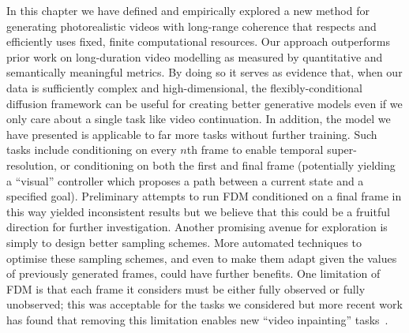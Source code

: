 In this chapter we have defined and empirically explored a new method for generating photorealistic videos with long-range coherence that respects and efficiently uses fixed, finite computational resources.
Our approach outperforms prior work on long-duration video modelling as measured by quantitative and semantically meaningful metrics. By doing so it serves as evidence that, when our data is sufficiently complex and high-dimensional, the flexibly-conditional diffusion framework can be useful for creating better generative models even if we only care about a single task like video continuation. In addition, the model we have presented is applicable to far more tasks without further training. Such tasks include conditioning on every $n$th frame to enable temporal super-resolution, or conditioning on both the first and final frame (potentially yielding a ``visual'' controller which proposes a path between a current state and a specified goal). Preliminary attempts to run FDM conditioned on a final frame in this way yielded inconsistent results but we believe that this could be a fruitful direction for further investigation. Another promising avenue for exploration is simply to design better sampling schemes. More automated techniques to optimise these sampling schemes, and even to make them adapt given the values of previously generated frames, could have further benefits. One limitation of FDM is that each frame it considers must be either fully observed or fully unobserved; this was acceptable for the tasks we considered but more recent work has found that removing this limitation enables new ``video inpainting'' tasks~\citep{green2024semantically}.
